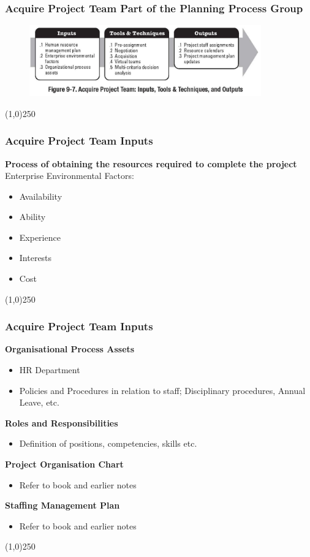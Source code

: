 \begin{frame}
\frametitle{Acquire Project Team \hfill Part of the Planning Process Group}
\begin{figure}
	\centering
		\includegraphics[width = 10cm]{images/Fig9-7.jpg}
	\label{fig:9-7}
\end{figure}
\end{frame}\begin{center}\line(1,0){250}\end{center}
 
 
\begin{frame}
\frametitle{Acquire Project Team \hfill Inputs}
\textbf{Process of obtaining the resources required to complete the project}\\
Enterprise Environmental Factors:
\begin{itemize}
	\item Availability
	\item Ability
	\item Experience
	\item Interests
	\item Cost
\end{itemize}
\end{frame}\begin{center}\line(1,0){250}\end{center}
 
 
\begin{frame}
\frametitle{Acquire Project Team \hfill Inputs}
\textbf{Organisational Process Assets}
\begin{itemize}
	\item HR Department
	\item Policies and Procedures in relation to staff; Disciplinary procedures, Annual Leave, etc.
\end{itemize}
\textbf{Roles and Responsibilities}
\begin{itemize}
	\item Definition of positions, competencies, skills etc.
\end{itemize}
\textbf{Project Organisation Chart}
\begin{itemize}
	\item Refer to book and earlier notes
\end{itemize}
\textbf{Staffing Management Plan}
\begin{itemize}
	\item Refer to book and earlier notes
\end{itemize}
\end{frame}\begin{center}\line(1,0){250}\end{center}
 
